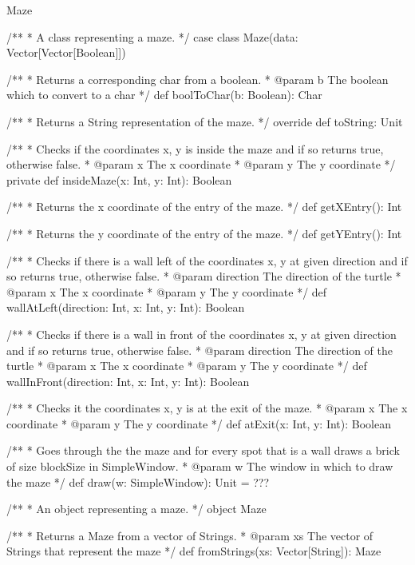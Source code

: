 \begin{ScalaSpec}{Maze}

/**
 *  A class representing a maze.
 */
case class Maze(data: Vector[Vector[Boolean]]) {
  
  /**
   *  Returns a corresponding char from a boolean.
   *  @param b	The boolean which to convert to a char
   */
  def boolToChar(b: Boolean): Char

  /**
   *  Returns a String representation of the maze.
   */
  override def toString: Unit

  /**
   *  Checks if the coordinates x, y is inside the maze and if 
   so returns true, otherwise false.
   *  @param x		The x coordinate
   *  @param y		The y coordinate
   */
  private def insideMaze(x: Int, y: Int): Boolean

  /**
   *  Returns the x coordinate of the entry of the maze.
   */
  def getXEntry(): Int

  /**
   * Returns the y coordinate of the entry of the maze.
   */
  def getYEntry(): Int

  /**
   *  Checks if there is a wall left of the coordinates x, y at 
   given direction and if so returns true, otherwise false.
   *  @param direction	The direction of the turtle
   *  @param x					The x coordinate
   *  @param y					The y coordinate
   */
  def wallAtLeft(direction: Int, x: Int, y: Int): Boolean

  /**
   *  Checks if there is a wall in front of the coordinates x, y at 
   given direction and if so returns true, otherwise false.
   *  @param direction	The direction of the turtle
   *  @param x					The x coordinate
   *  @param y					The y coordinate
   */
  def wallInFront(direction: Int, x: Int, y: Int): Boolean

  /**
   *  Checks it the coordinates x, y is at the exit of the maze.
   *  @param x					The x coordinate
   *  @param y					The y coordinate
   */
  def atExit(x: Int, y: Int): Boolean

  /**
   *  Goes through the the maze and for every spot that is a wall 
   draws a brick of size blockSize in SimpleWindow.
   *  @param w		The window in which to draw the maze
   */
  def draw(w: SimpleWindow): Unit = ???
    
}

/**
 *  An object representing a maze.
 */
object Maze {

  /**
   *  Returns a Maze from a vector of Strings.
   *  @param xs	The vector of Strings that represent the maze
   */
  def fromStrings(xs: Vector[String]): Maze

}
\end{ScalaSpec}
